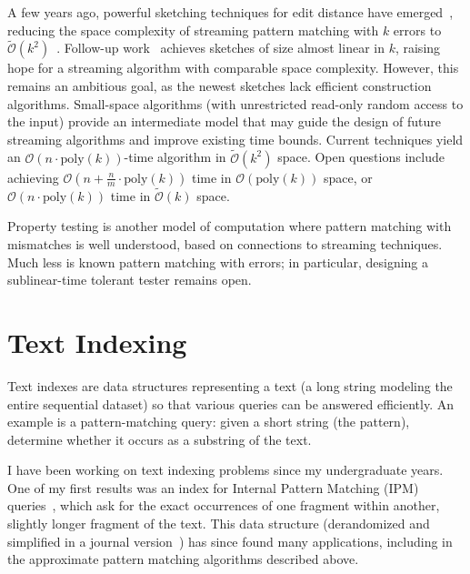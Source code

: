 \documentclass[a4paper,11pt]{article}
\newcommand{\Oh}{\mathcal{O}}
\newcommand{\Ohtilde}{\tilde{\mathcal{O}}}
\begin{document}
A few years ago, powerful sketching techniques for edit distance have emerged~\cite{DBLP:conf/stoc/Bhattacharya023}, reducing the space complexity of streaming pattern matching with $k$ errors to $\Ohtilde(k^2)$~\cite{DBLP:conf/icalp/Bhattacharya023}.
Follow-up work~\cite{KS24} achieves sketches of size almost linear in $k$, raising hope for a streaming algorithm with comparable space complexity. 
However, this remains an ambitious goal, as the newest sketches lack efficient construction algorithms.
Small-space algorithms (with unrestricted read-only random access to the input) provide an intermediate model that may guide the design of future streaming algorithms and improve existing time bounds. 
Current techniques yield an $\Oh(n\cdot \mathrm{poly}(k))$-time algorithm in $\Ohtilde(k^2)$ space.
Open questions include achieving $\Oh(n+\frac{n}{m}\cdot \mathrm{poly}(k))$ time in $\Oh(\mathrm{poly}(k))$ space, or $\Oh(n\cdot \mathrm{poly}(k))$ time in $\Ohtilde(k)$ space.

Property testing is another model of computation where pattern matching with mismatches is well understood, based on connections to streaming techniques. 
Much less is known pattern matching with errors; in particular, designing a sublinear-time tolerant tester remains open.
\section{Text Indexing}
Text indexes are data structures representing a text (a long string modeling the entire sequential dataset) so that various queries can be answered efficiently. 
An example is a pattern-matching query: given a short string (the pattern), determine whether it occurs as a substring of the text.

I have been working on text indexing problems since my undergraduate years. 
One of my first results was an index for Internal Pattern Matching (IPM) queries~\cite{SODA2015_Kociumaka}, which ask for the exact occurrences of one fragment within another, slightly longer fragment of the text.
This data structure (derandomized and simplified in a journal version~\cite{KRRW24}) has since found many applications, including in the approximate pattern matching algorithms described above.
\end{document}
